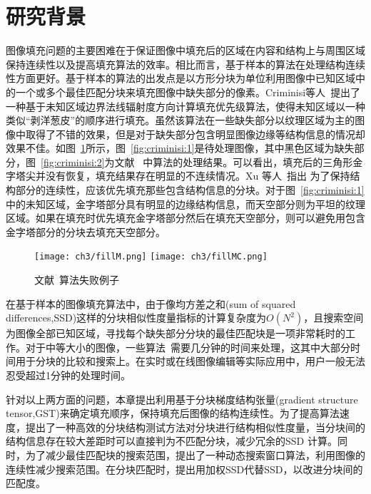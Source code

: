  \section{研究背景}
 \label{ch3:sec:background}
 图像填充问题的主要困难在于保证图像中填充后的区域在内容和结构上与周围区域保持连续性以及提高填充算法的效率。相比而言，基于样本的算法在处理结构连续性方面更好。基于样本的算法的出发点是以方形分块为单位利用图像中已知区域中的一个或多个最佳匹配分块来填充图像中缺失部分的像素。Criminisi等人~\cite{Criminisi04regionfilling}提出了一种基于未知区域边界法线辐射度方向计算填充优先级算法，使得未知区域以一种类似``剥洋葱皮''的顺序进行填充。虽然该算法在一些缺失部分以纹理区域为主的图像中取得了不错的效果，但是对于缺失部分包含明显图像边缘等结构信息的情况却效果不佳。如图~\ref{fig:criminisi}所示，图~\ref{fig:criminisi:1}是待处理图像，其中黑色区域为缺失部分，图~\ref{fig:criminisi:2}为文献~ 中算法的处理结果。可以看出，填充后的三角形金字塔尖并没有恢复，填充结果存在明显的不连续情况。Xu 等人~\cite{Xu:2010}指出 为了保持结构部分的连续性，应该优先填充那些包含结构信息的分块。对于图~\ref{fig:criminisi:1}中的未知区域，金字塔部分具有明显的边缘结构信息，而天空部分则为平坦的纹理区域。如果在填充时优先填充金字塔部分然后在填充天空部分，则可以避免用包含金字塔部分的分块去填充天空部分。\par
 \begin{figure}[htb]
   \centering%
     {\texttt{[image: ch3/fillM.png]}}%
  \hspace{1em}%
       {\texttt{[image: ch3/fillMC.png]}}
   \caption{文献~算法失败例子}
   \label{fig:criminisi}
 \end{figure}
 在基于样本的图像填充算法中，由于像均方差之和(sum of squared differences,SSD)这样的分块相似性度量指标的计算复杂度为$O(N^2)$，且搜索空间为图像全部已知区域，寻找每个缺失部分分块的最佳匹配块是一项非常耗时的工作。对于中等大小的图像，一些算法~\cite{Xu:2010}需要几分钟的时间来处理，这其中大部分时间用于分块的比较和搜索上。在实时或在线图像编辑等实际应用中，用户一般无法忍受超过1分钟的处理时间。\par
 针对以上两方面的问题，本章提出利用基于分块梯度结构张量(gradient structure tensor,GST)来确定填充顺序，保持填充后图像的结构连续性。为了提高算法速度，提出了一种高效的分块结构测试方法对分块进行结构相似性度量，当分块间的结构信息存在较大差距时可以直接判为不匹配分块，减少冗余的SSD 计算。同时，为了减少最佳匹配块的搜索范围，提出了一种动态搜索窗口算法，利用图像的连续性减少搜索范围。在分块匹配时，提出用加权SSD代替SSD，以改进分块间的匹配度。
